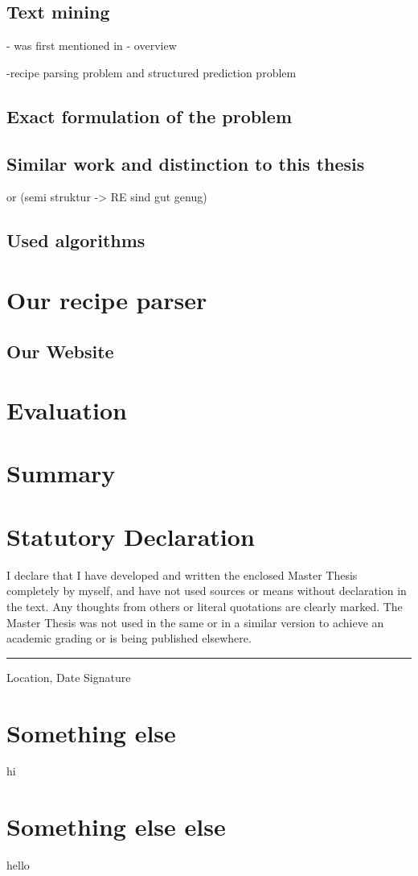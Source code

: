 \documentclass[12pt, twoside]{report}
\begin{document}
\section{Text mining}
- was first mentioned in \parencite{KDT}
- overview \parencite{surveyOfTextMining}

-recipe parsing problem and structured prediction problem 

\section{Exact formulation of the problem}
\section{Similar work and distinction to this thesis}
\cite{ingredientNetworks} or \cite{recipeRecommendation} (semi struktur -> RE sind gut genug)
\section{Used algorithms}


\chapter{Our recipe parser}
\section{Our Website}
\chapter{Evaluation}
\chapter{Summary}


\appendix
\chapter{Statutory Declaration}
I declare that I have developed and written the enclosed Master Thesis completely by myself, and have not used sources or means without declaration in the text. Any thoughts from others or literal quotations are clearly marked. The Master Thesis was not used in the same or in a similar version to achieve an academic grading or is being published elsewhere.
\newline
\newline
\newline
\rule{\textwidth}{1pt}
Location, Date \hfill Signature 

\chapter{Something else}
hi

\chapter{Something else else}
hello

\printbibliography
\end{document}
